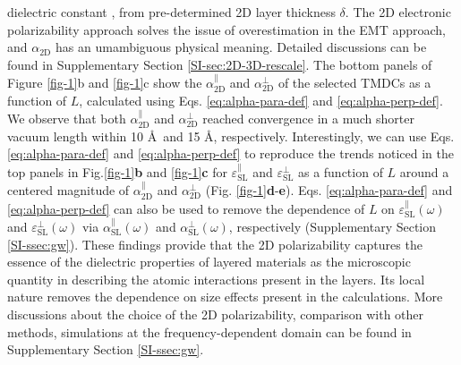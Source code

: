 \documentclass[journal=ancac3,manuscript=article,email=true,hyperref=true,keywords=false]{achemso}
\begin{document}
dielectric constant \cite{Matthes_2016,Laturia_2018}, from
pre-determined 2D layer thickness $\delta$. The 2D electronic
polarizability approach solves the issue of overestimation in the EMT
approach, and $\alpha_{\mathrm{2D}}$ has an umambiguous physical
meaning. Detailed discussions can be found in Supplementary Section
\ref{SI-sec:2D-3D-rescale}.
%
%
The bottom panels of Figure \ref{fig-1}b and \ref{fig-1}c show the
$\alpha_{\mathrm{2D}}^{\parallel}$ and $\alpha_{\mathrm{2D}}^{\perp}$
of the selected TMDCs as a function of $L$, calculated using
Eqs. \ref{eq:alpha-para-def} and \ref{eq:alpha-perp-def}. We observe
that both $\alpha_{\mathrm{2D}}^{\parallel}$ and $\alpha_{\mathrm{2D}}^{\perp}$ reached 
convergence in a much shorter vacuum length within 10 \AA ~and 15 \AA, respectively. 
%
%
Interestingly, we can use Eqs.\ref{eq:alpha-para-def} and
\ref{eq:alpha-perp-def} to reproduce the trends noticed in the top
panels in Fig.\ref{fig-1}{\textbf b} and \ref{fig-1}{\textbf c} for
$\varepsilon_{\mathrm{SL}}^{\parallel}$ and
$\varepsilon_{\mathrm{SL}}^{\perp}$ as a function of $L$ around a
centered magnitude of $\alpha_{\mathrm{2D}}^{\parallel}$ and
$\alpha_{\mathrm{2D}}^{\perp}$
(Fig. \ref{fig-1}\textbf{d}-\textbf{e}).
Eqs. \ref{eq:alpha-para-def} and \ref{eq:alpha-perp-def} can also be used to remove 
the dependence of $L$ on $\varepsilon^{\parallel}_{\mathrm{SL}}(\omega)$ and
$\varepsilon^{\perp}_{\mathrm{SL}}(\omega)$ via $\alpha^{\parallel}_{\mathrm{SL}}(\omega)$ and
$\alpha^{\perp}_{\mathrm{SL}}(\omega)$, respectively (Supplementary Section \ref{SI-ssec:gw}). 
%
% 
% 
% 
% 
These findings provide that the 2D polarizability captures the essence
of the dielectric properties of layered materials as the microscopic
quantity in describing the atomic interactions present in the
layers. Its local nature removes the dependence on size effects
present in the calculations.  More discussions about the choice of the
2D polarizability, comparison with other methods, simulations at the
frequency-dependent domain can be found in Supplementary Section
\ref{SI-ssec:gw}.

\end{document}
